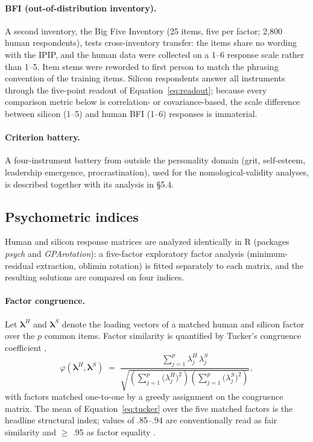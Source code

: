 \documentclass[11pt]{article}
\begin{document}
\paragraph{BFI (out-of-distribution inventory).} A second inventory, the Big Five Inventory (25 items, five per factor; 2,800 human respondents), tests cross-inventory transfer: the items share no wording with the IPIP, and the human data were collected on a 1--6 response scale rather than 1--5. Item stems were reworded to first person to match the phrasing convention of the training items. Silicon respondents answer all instruments through the five-point readout of Equation~\ref{eq:readout}; because every comparison metric below is correlation- or covariance-based, the scale difference between silicon (1--5) and human BFI (1--6) responses is immaterial.

\paragraph{Criterion battery.} A four-instrument battery from outside the personality domain (grit, self-esteem, leadership emergence, procrastination), used for the nomological-validity analyses, is described together with its analysis in \S{}5.4.

\subsection{Psychometric indices}
\label{sec:indices}

Human and silicon response matrices are analyzed identically in R (packages \textit{psych} and \textit{GPArotation}): a five-factor exploratory factor analysis (minimum-residual extraction, oblimin rotation) is fitted separately to each matrix, and the resulting solutions are compared on four indices.

\paragraph{Factor congruence.} Let $\boldsymbol{\lambda}^{H}$ and $\boldsymbol{\lambda}^{S}$ denote the loading vectors of a matched human and silicon factor over the $p$ common items. Factor similarity is quantified by Tucker's congruence coefficient \citep{tucker1951},
\begin{equation}
\varphi\!\left(\boldsymbol{\lambda}^{H}, \boldsymbol{\lambda}^{S}\right) \;=\; \frac{\sum_{j=1}^{p} \lambda^{H}_{j}\, \lambda^{S}_{j}}{\sqrt{\left(\sum_{j=1}^{p} \bigl(\lambda^{H}_{j}\bigr)^{2}\right)\left(\sum_{j=1}^{p} \bigl(\lambda^{S}_{j}\bigr)^{2}\right)}},
\label{eq:tucker}
\end{equation}
with factors matched one-to-one by a greedy assignment on the congruence matrix. The mean of Equation~\ref{eq:tucker} over the five matched factors is the headline structural index; values of .85--.94 are conventionally read as fair similarity and $\geq$ .95 as factor equality \citep{lorenzoseva2006}.
\end{document}
